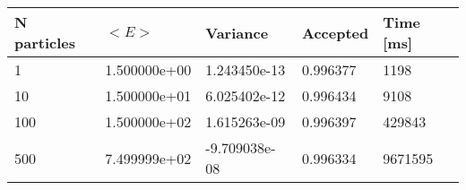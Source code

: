 \begin{table}[h!]
\begin{tabular}{|l|l|l|l|l|}
\hline 
N particles & $<E>$ & Variance & Accepted & Time [ms]\\ 
 \hline 
1 & 1.500000e+00 & 1.243450e-13 & 0.996377 & 1198 \\ \hline 
10 & 1.500000e+01 & 6.025402e-12 & 0.996434 & 9108 \\ \hline 
100 & 1.500000e+02 & 1.615263e-09 & 0.996397 & 429843 \\ \hline 
500 & 7.499999e+02 & -9.709038e-08 & 0.996334 & 9671595 \\ \hline 
\end{tabular}
\label{i:n3} 
\end{table}
